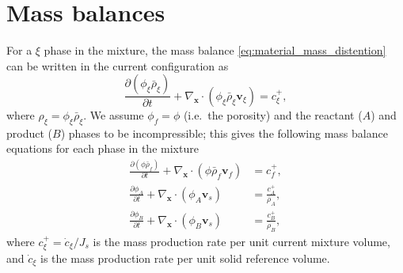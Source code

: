 \documentclass[11pt]{article}
\begin{document}
\section{Mass balances}
For a $\xi$ phase in the mixture, the mass balance \eqref{eq:material_mass_distention} can be written in the current configuration as
%
\[
  \frac{\partial \left(\phi_\xi \bar\rho_\xi\right)}{\partial t} + \nabla_{\mathbf{x}} \cdot \left(\phi_\xi \bar\rho_\xi \mathbf{v}_\xi\right) = c^{+}_\xi,
\]
where $\rho_\xi = \phi_\xi \bar{\rho}_\xi$.
%
We assume $\phi_f = \phi$ (i.e.\ the porosity) and the reactant ($A$) and product ($B$) phases to be incompressible; this gives the following mass balance equations for each phase in the mixture
%
\begin{subequations}
\begin{align}
  \frac{\partial \left(\phi \bar\rho_f\right)}{\partial t} + \nabla_{\mathbf{x}} \cdot \left(\phi \bar\rho_f \mathbf{v}_f\right) &= c^{+}_f, \label{eq:mass_f} \\
  \frac{\partial \phi_A }{\partial t} + \nabla_{\mathbf{x}} \cdot \left(\phi_A  \mathbf{v}_s\right) &= \frac{c^{+}_A}{\bar\rho_A}, \label{eq:mass_A} \\
  \frac{\partial \phi_B }{\partial t} + \nabla_{\mathbf{x}} \cdot \left(\phi_B  \mathbf{v}_s\right) &= \frac{c^{+}_B}{\bar\rho_B}, \label{eq:mass_B}
\end{align}
  \label{eq:mass_all}
\end{subequations}
where $c_\xi^+=\dot c_\xi/J_s$ is the mass production rate per unit current mixture volume, and $\dot{c}_\xi$ is the mass production rate per unit solid reference volume.
\end{document}
